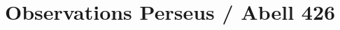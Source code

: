 \documentclass[11pt,a4paper]{article}
\begin{document}

\section*{Observations Perseus / Abell 426}
\begin{justify}

\end{justify}
\end{document}
